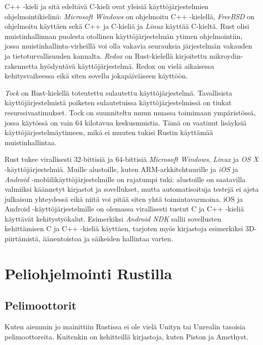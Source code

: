 \documentclass[finnish]{tktltiki2}
\theoremstyle{definition}
\theoremstyle{remark}
\begin{document}
C++ -kieli ja sitä edeltävä C-kieli ovat yleisiä käyttöjärjestelmien ohjelmointikielinä: \textit{Microsoft Windows} on ohjelmoitu C++ -kielellä, \textit{FreeBSD} on ohjelmoitu käyttäen sekä C++ ja C-kieliä ja \textit{Linux} käyttää C-kieltä. Rust olisi muistinhallinnan puolesta otollinen käyttöjärjestelmän ytimen ohjelmointiin, jossa muistinhallinta-virheillä voi olla vakavia seurauksia järjestelmän vakauden ja tietoturvallisuuden kannalta. \textit{Redox} on Rust-kielellä kirjoitettu mikroydin-rakennetta hyödyntävä käyttöjärjestelmä.\cite{WhatRedoxIs} Redox on vielä aikaisessa kehitysvaiheessa eikä siten sovellu jokapäiväiseen käyttöön.

\textit{Tock} on Rust-kielellä toteutettu sulautettu käyttöjärjestelmä.\cite{OwnershipIsTheft} Tavallisista käyttöjärjestelmistä poiketen sulautetuissa käyttöjärjestelmissä on tiukat resurssivaatimukset. Tock on suunniteltu muun muassa toimimaan ympäristössä, jossa käytössä on vain 64 kilotavua keskusmuistia. Tämä on vaatinut lisäyksiä käyttöjärjestelmäytimeen, mikä ei muuten tukisi Rustin käyttämää muistinhallintaa. %

Rust tukee virallisesti 32-bittisiä ja 64-bittisiä \textit{Microsoft Windows}, \textit{Linux} ja \textit{OS X} -käyttöjärjestelmiä.\cite{RustPlatformSupport} Muille alustoille, kuten ARM-arkkitehtuurille ja \textit{iOS} ja \textit{Android} -mobiilikäyttöjärjestelmille on rajatumpi tuki: alustoille on saatavilla valmiiksi käännetyt kirjastot ja sovellukset, mutta automatisoituja testejä ei ajeta julkaisun yhteydessä eikä niitä voi pitää siten yhtä toimintavarmoina. iOS ja Android -käyttöjärjestelmille on olemassa virallisesti tuetut C ja C++ -kieliä käyttävät kehitystyökalut. Esimerkiksi \textit{Android NDK} sallii sovellusten kehittämisen C ja C++ -kieliä käyttäen, tarjoten myös kirjastoja esimerkiksi 3D-piirtämistä, äänentoistoa ja säikeiden hallintaa varten.\cite{AndroidNDK}

\section{Peliohjelmointi Rustilla}

\subsection{Pelimoottorit}
Kuten aiemmin jo mainittiin Rustissa ei ole vielä Unityn tai Unrealin tasoisia pelimoottoreita. Kuitenkin on kehitteillä kirjastoja, kuten Piston ja Amethyst. 
\end{document}
